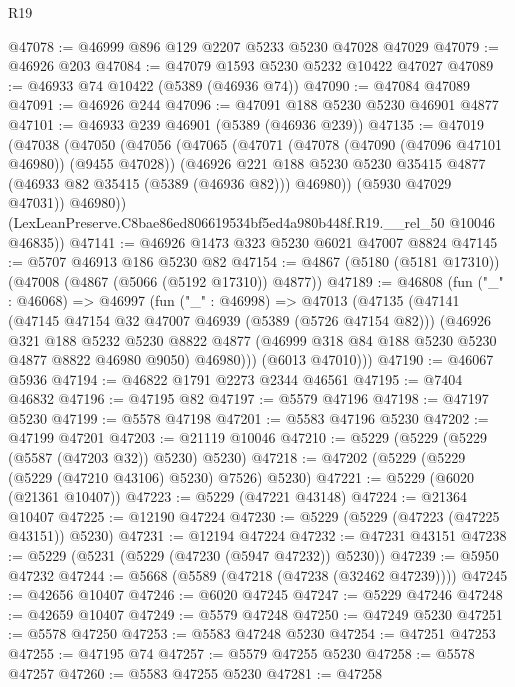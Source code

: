 \begin{lexlean}{R19}
\begin{coremodule}
@47078 := @46999 @896 @129 @2207 @5233 @5230 @47028 @47029
@47079 := @46926 @203
@47084 := @47079 @1593 @5230 @5232 @10422 @47027
@47089 := @46933 @74 @10422 (@5389 (@46936 @74))
@47090 := @47084 @47089
@47091 := @46926 @244
@47096 := @47091 @188 @5230 @5230 @46901 @4877
@47101 := @46933 @239 @46901 (@5389 (@46936 @239))
@47135 := @47019
    (@47038
      (@47050
        (@47056
          (@47065
            (@47071
              (@47078 (@47090 (@47096 @47101 @46980)) (@9455 @47028))
              (@46926
                @221
                @188
                @5230
                @5230
                @35415
                @4877
                (@46933 @82 @35415 (@5389 (@46936 @82)))
                @46980))
            (@5930 @47029 @47031))
          @46980))
      (LexLeanPreserve.C8bae86ed806619534bf5ed4a980b448f.R19.__rel_50 @10046 @46835))
@47141 := @46926 @1473 @323 @5230 @6021 @47007 @8824
@47145 := @5707 @46913 @186 @5230 @82
@47154 := @4867 (@5180 (@5181 @17310)) (@47008 (@4867 (@5066 (@5192 @17310)) @4877))
@47189 := @46808
    (fun ("_" : @46068) =>
    @46997
      (fun ("_" : @46998) =>
      @47013
        (@47135
          (@47141
            (@47145 @47154 @32 @47007 @46939 (@5389 (@5726 @47154 @82)))
            (@46926
              @321
              @188
              @5232
              @5230
              @8822
              @4877
              (@46999 @318 @84 @188 @5230 @5230 @4877 @8822 @46980 @9050)
              @46980)))
        (@6013 @47010)))
@47190 := @46067 @5936
@47194 := @46822 @1791 @2273 @2344 @46561
@47195 := @7404 @46832
@47196 := @47195 @82
@47197 := @5579 @47196
@47198 := @47197 @5230
@47199 := @5578 @47198
@47201 := @5583 @47196 @5230
@47202 := @47199 @47201
@47203 := @21119 @10046
@47210 := @5229 (@5229 (@5229 (@5587 (@47203 @32)) @5230) @5230)
@47218 := @47202 (@5229 (@5229 (@5229 (@47210 @43106) @5230) @7526) @5230)
@47221 := @5229 (@6020 (@21361 @10407))
@47223 := @5229 (@47221 @43148)
@47224 := @21364 @10407
@47225 := @12190 @47224
@47230 := @5229 (@5229 (@47223 (@47225 @43151)) @5230)
@47231 := @12194 @47224
@47232 := @47231 @43151
@47238 := @5229 (@5231 (@5229 (@47230 (@5947 @47232)) @5230))
@47239 := @5950 @47232
@47244 := @5668 (@5589 (@47218 (@47238 (@32462 @47239))))
@47245 := @42656 @10407
@47246 := @6020 @47245
@47247 := @5229 @47246
@47248 := @42659 @10407
@47249 := @5579 @47248
@47250 := @47249 @5230
@47251 := @5578 @47250
@47253 := @5583 @47248 @5230
@47254 := @47251 @47253
@47255 := @47195 @74
@47257 := @5579 @47255 @5230
@47258 := @5578 @47257
@47260 := @5583 @47255 @5230
@47281 := @47258

\end{coremodule}
\end{lexlean}
